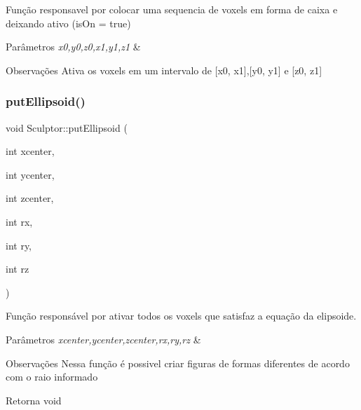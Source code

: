 Função responsavel por colocar uma sequencia de voxels em forma de caixa e deixando ativo (is\+On = true) 


\begin{DoxyParams}{Parâmetros}
{\em x0,y0,z0,x1,y1,z1} & \\
\hline
\end{DoxyParams}
\begin{DoxyRemark}{Observações}
Ativa os voxels em um intervalo de \mbox{[}x0, x1\mbox{]},\mbox{[}y0, y1\mbox{]} e \mbox{[}z0, z1\mbox{]} 
\end{DoxyRemark}
\mbox{\label{class_sculptor_a093615b0c2b9b3a17a56300b9b939f39}} 
\subsubsection{\texorpdfstring{put\+Ellipsoid()}{putEllipsoid()}}
{\footnotesize\ttfamily void Sculptor\+::put\+Ellipsoid (\begin{DoxyParamCaption}\item[{int}]{xcenter,  }\item[{int}]{ycenter,  }\item[{int}]{zcenter,  }\item[{int}]{rx,  }\item[{int}]{ry,  }\item[{int}]{rz }\end{DoxyParamCaption})}



Função responsável por ativar todos os voxels que satisfaz a equação da elipsoide. 


\begin{DoxyParams}{Parâmetros}
{\em xcenter,ycenter,zcenter,rx,ry,rz} & \\
\hline
\end{DoxyParams}
\begin{DoxyRemark}{Observações}
Nessa função é possivel criar figuras de formas diferentes de acordo com o raio informado 
\end{DoxyRemark}
\begin{DoxyReturn}{Retorna}
void 
\end{DoxyReturn}
\mbox{\label{class_sculptor_a794a2b6ee8fc8098fd6150cb46101fc6}} 
